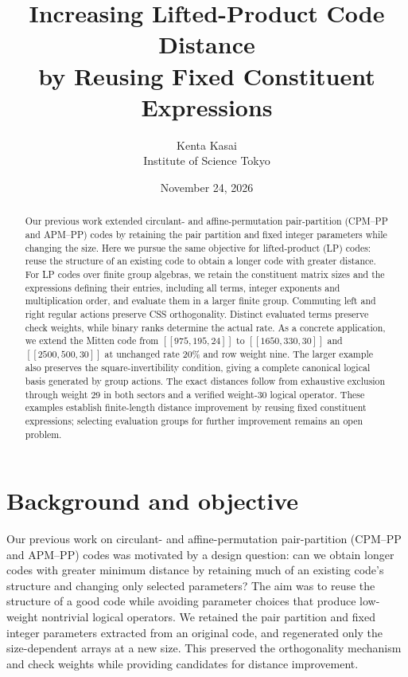 \documentclass[12pt]{article}
\title{Increasing Lifted-Product Code Distance\\by Reusing Fixed Constituent Expressions}
\author{Kenta Kasai\\\small Institute of Science Tokyo}
\date{November 24, 2026}
\begin{document}
\maketitle
\thispagestyle{fancy}

\begin{abstract}
Our previous work extended circulant- and affine-permutation pair-partition
(CPM--PP and APM--PP) codes by retaining the pair partition and fixed
integer parameters while changing the size. Here we pursue the same
objective for lifted-product (LP) codes: reuse the structure of an existing
code to obtain a longer code with greater distance. For LP codes over
finite group algebras, we retain the constituent matrix sizes and the
expressions defining their entries, including all terms, integer exponents
and multiplication order, and evaluate them in a larger finite group.
Commuting left and right regular actions preserve CSS orthogonality.
Distinct evaluated terms preserve check weights, while binary ranks
determine the actual rate.
As a concrete application, we extend the Mitten code from $[[975,195,24]]$
to $[[1650,330,30]]$ and $[[2500,500,30]]$ at unchanged rate 20\%
and row weight nine. The larger example also preserves the
square-invertibility condition, giving a complete canonical logical basis
generated by group actions.
The exact distances follow from exhaustive exclusion through weight 29
in both sectors and a verified weight-30 logical operator.
These examples establish finite-length distance improvement by reusing fixed
constituent expressions;
selecting evaluation groups for further improvement remains an open problem.
\end{abstract}

\section{Background and objective}
Our previous work on circulant- and affine-permutation pair-partition
(CPM--PP and APM--PP) codes \cite[Secs.~2--3]{explicit} was motivated by
a design question: can we obtain longer codes with greater minimum
distance by retaining much of an existing code's structure and changing
only selected parameters? The aim was to reuse the structure of a good
code while avoiding parameter choices that produce low-weight nontrivial
logical operators. We retained the pair partition and fixed integer
parameters extracted from an original code, and regenerated only the
size-dependent arrays at a new size. This preserved the orthogonality
mechanism and check weights while providing candidates for distance
improvement.
\end{document}
